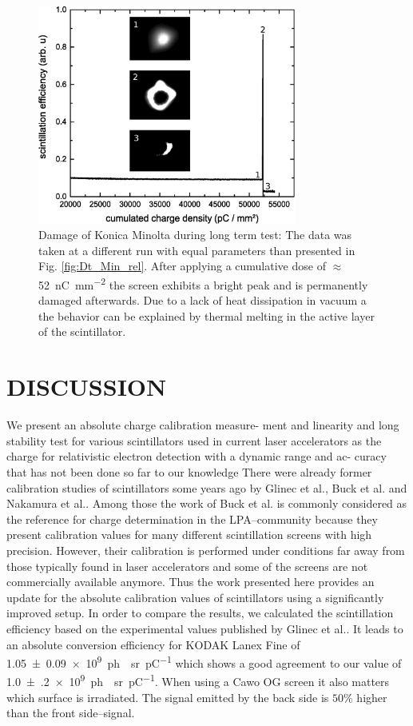 \documentclass[%
reprint,
amsmath,
amssymb,
aip,
rsi, 
numerical,
floatfix,
]{revtex4-1}
\newcommand{\myCite}[1]{\textcolor{blue}{\cite{#1}}}
\begin{document}
\begin{figure}
\includegraphics[width=8.5cm]{./Figures/Damage}%
\caption{\label{fig:Damage} Damage of Konica Minolta during long term test: 
The data was taken at a different run with equal parameters than presented in Fig. \ref{fig:Dt_Min_rel}. 
After applying a cumulative dose of $\approx$ \SI[per-mode=symbol]{52}{\nano \coulomb \per \square \milli \meter} the screen exhibits a bright peak and is permanently damaged afterwards. 
Due to a lack of heat dissipation in vacuum a the behavior can be explained by thermal melting in the active layer of the scintillator.}
\end{figure}

\section{\label{Cn} DISCUSSION}
We present an absolute charge calibration measure-
ment and linearity and long stability test for various scintillators used in current laser accelerators as the charge  for relativistic electron detection with a dynamic range and ac- curacy that has not been done so far to our knowledge
There were already former calibration studies of scintillators some years ago by Glinec et al.\myCite{Glinec2006}, Buck et al.\myCite{Buck2010} and Nakamura et al.\myCite{Nakamura2011}.
Among those the work of Buck et al.\myCite{Buck2010} is commonly considered as the reference for charge determination in the LPA--community because they present calibration values for many different scintillation screens with high precision.
However, their calibration is performed under conditions far away from those typically found in laser accelerators and some of the screens are not commercially available anymore.
Thus the work presented here provides an update for the absolute calibration values of scintillators using a significantly improved setup. 
In order to compare the results, we calculated the scintillation efficiency based on the experimental values published by Glinec et al.\myCite{Glinec2006}. 
It leads to an absolute conversion efficiency for KODAK Lanex Fine of \SI[separate-uncertainty = true]{1.05(9)e9}{ph \per \steradian \per \pico \coulomb} which shows a good agreement to our value of \SI[separate-uncertainty = true]{1.0(2)e9}{ph \per \steradian \per \pico \coulomb}.
When using a Cawo OG screen it also matters which surface is irradiated.
The signal emitted by the back side is $50\%$ higher than the front side--signal.
 
\end{document}
